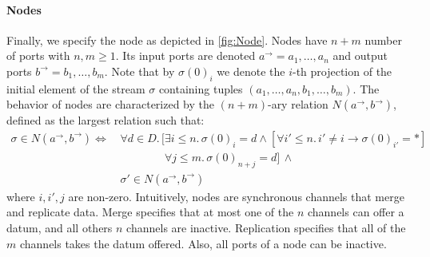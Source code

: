 \paragraph{Nodes}

Finally, we specify the node as depicted in \ref{fig:Node}.
Nodes have $n+m$ number of ports with $n,m\geq1$.
Its input ports are denoted $a^{\rightarrow}=a_1,\ldots,a_n$ and output ports $b^{\rightarrow}=b_1,\ldots,b_m$.
Note that by $\sigma(0)_i$ we denote the $i$-th projection of the initial element of
the stream $\sigma$ containing tuples $(a_1,\ldots,a_n,b_1,\ldots,b_m)$.
The behavior of nodes are characterized by the $(n+m)$-ary relation $N(a^{\rightarrow},b^{\rightarrow})$,
defined as the largest relation such that:
\begin{align*}
	\sigma\in N(a^{\rightarrow},b^{\rightarrow})\Leftrightarrow\, & \forall d\in D.\,
	\bigl[\exists i\leq n.\,\sigma(0)_i = d\land\left[\forall i'\leq n.\,i'\neq i\rightarrow\sigma(0)_{i'} = *\right]\\
	& \phantom{\forall d\in D.\, \bigl[}\forall j\leq m.\,\sigma(0)_{n+j}=d\bigr]\,\land\\
	& \sigma'\in N(a^{\rightarrow},b^{\rightarrow})
\end{align*}
where $i,i',j$ are non-zero.
Intuitively, nodes are synchronous channels that merge and replicate data.
Merge specifies that at most one of the $n$ channels can offer a datum,
and all others $n$ channels are inactive.
Replication specifies that all of the $m$ channels takes the datum offered.
Also, all ports of a node can be inactive.


\vfill
